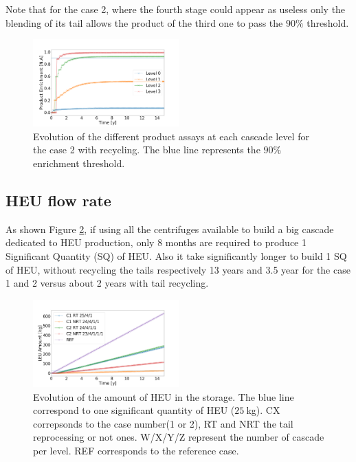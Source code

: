 \documentclass{anstrans}
\begin{document}
Note that for the case 2, where the fourth stage could appear as useless only the
blending of its tail allows the product of the third one to pass the $90\%$ threshold.

\begin{figure}[ht] %
  \centering
  \includegraphics[width=0.5\textwidth]{assay_case_2_rec.png}
  \caption{Evolution of the different product assays at each cascade level for
  the case 2 with recycling. The blue line represents the $90\%$ enrichment
  threshold.}\label{fig:assay_c2_r}
\end{figure}


\subsection{HEU flow rate}
As shown Figure \ref{fig:heu_prod}, if using all the centrifuges available to
build a big cascade dedicated to HEU production, only 8 months are required to
produce 1 Significant Quantity (SQ) of HEU. Also it take significantly longer to
build 1 SQ of HEU, without recycling the tails respectively 13 years and 3.5 year
for the case 1 and 2 versus about 2 years with tail recycling.

\begin{figure}[ht] %
  \centering
  \includegraphics[width=0.5\textwidth]{HEU_prod.png}
  \caption{Evolution of the amount of HEU in the storage. The blue line
  correspond to one significant quantity of HEU ($25~$kg). CX correpsonds to the
  case number(1 or 2), RT and NRT the tail reprocessing or not ones. W/X/Y/Z represent the
  number of cascade per level. REF corresponds to the reference
  case.}\label{fig:heu_prod}
\end{figure}
\end{document}
